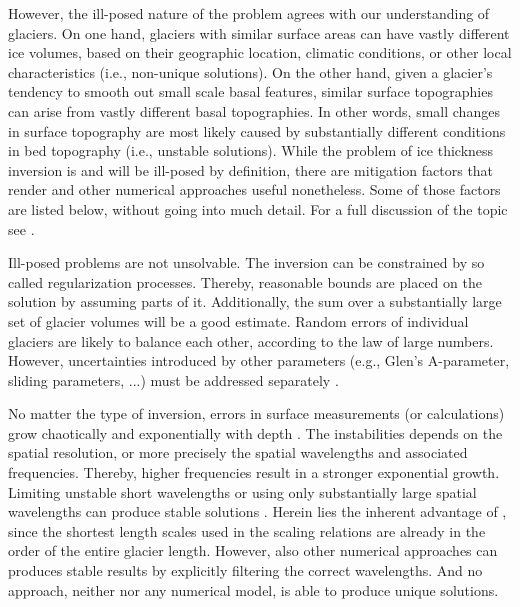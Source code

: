             However, the ill-posed nature of the problem agrees with our understanding of glaciers. On one hand, glaciers with similar surface areas can have vastly different ice volumes, based on their geographic location, climatic conditions, or other local characteristics (i.e., non-unique solutions). On the other hand, given a glacier's tendency to smooth out small scale basal features, similar surface topographies can arise from vastly different basal topographies. In other words, small changes in surface topography are most likely caused by substantially different conditions in bed topography (i.e., unstable solutions). While the problem of ice thickness inversion is and will be ill-posed by definition, there are mitigation factors that render \vas{} and other numerical approaches useful nonetheless. Some of those factors are listed below, without going into much detail. For a full discussion of the topic see \citet{Bahr2014}.

            Ill-posed problems are not unsolvable. The inversion can be constrained by so called regularization processes. Thereby, reasonable bounds are placed on the solution by assuming parts of it. Additionally, the sum over a substantially large set of glacier volumes will be a good estimate. Random errors of individual glaciers are likely to balance each other, according to the law of large numbers. However, uncertainties introduced by other parameters (e.g., Glen's A-parameter, sliding parameters, ...) must be addressed separately \citep{Bahr2014}.

            No matter the type of inversion, errors in surface measurements (or calculations) grow chaotically and exponentially with depth \citep{Bahr1994}. The instabilities depends on the spatial resolution, or more precisely the spatial wavelengths and associated frequencies. Thereby, higher frequencies result in a stronger exponential growth. Limiting unstable short wavelengths or using only substantially large spatial wavelengths can produce stable solutions \citep{Bahr2014}. Herein lies the inherent advantage of \vas{}, since the shortest length scales used in the scaling relations are already in the order of the entire glacier length. However, also other numerical approaches can produces stable results by explicitly filtering the correct wavelengths. And no approach, neither \vas{} nor any numerical model, is able to produce unique solutions.


